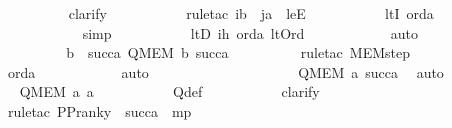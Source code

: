\begin{isabellebody}
\ \ \ \ \ \ \ \ \isamarkupfalse%
\ clarify\ \isanewline
\ \ \ \ \ \ \ \ \isamarkupfalse%
\ {\isacharparenleft}{\kern0pt}rule{\isacharunderscore}{\kern0pt}tac\ i{\isacharequal}{\kern0pt}b\ \ j{\isacharequal}{\kern0pt}a\ \ leE{\isacharparenright}{\kern0pt}\ \isanewline
\ \ \ \ \ \ \ \ \isamarkupfalse%
\ ltI\ orda\ \isanewline
\ \ \ \ \ \ \ \ \ \ \isamarkupfalse%
\ simp\ \isanewline
\ \ \ \ \ \ \ \ \isamarkupfalse%
\ ltD\ ih\ orda\ lt{\isacharunderscore}{\kern0pt}Ord\ \isanewline
\ \ \ \ \ \ \ \ \ \isamarkupfalse%
\ auto\ \isanewline
\ \ \ \ \ \ \ \ \isamarkupfalse%
\ \isanewline
\ \ \ \ \ \ \isamarkupfalse%
\ \isamarkupfalse%
\ {\isachardoublequoteopen}{\isasymforall}b\ {\isasymin}\ succ{\isacharparenleft}{\kern0pt}a{\isacharparenright}{\kern0pt}{\isachardot}{\kern0pt}\ Q{\isacharparenleft}{\kern0pt}MEM{\isacharcomma}{\kern0pt}\ b{\isacharcomma}{\kern0pt}\ succ{\isacharparenleft}{\kern0pt}a{\isacharparenright}{\kern0pt}{\isacharparenright}{\kern0pt}{\isachardoublequoteclose}\isanewline
\ \ \ \ \ \ \ \ \isamarkupfalse%
\ {\isacharparenleft}{\kern0pt}rule{\isacharunderscore}{\kern0pt}tac\ MEM{\isacharunderscore}{\kern0pt}step{\isacharparenright}{\kern0pt}\ \isanewline
\ \ \ \ \ \ \ \ \isamarkupfalse%
\ orda\ \isanewline
\ \ \ \ \ \ \ \ \ \isamarkupfalse%
\ auto\ \isanewline
\ \ \ \ \ \ \ \ \isamarkupfalse%
\ \isanewline
\ \ \ \ \ \ \isamarkupfalse%
\ \isamarkupfalse%
\ {\isachardoublequoteopen}Q{\isacharparenleft}{\kern0pt}MEM{\isacharcomma}{\kern0pt}\ a{\isacharcomma}{\kern0pt}\ succ{\isacharparenleft}{\kern0pt}a{\isacharparenright}{\kern0pt}{\isacharparenright}{\kern0pt}{\isachardoublequoteclose}\ \isamarkupfalse%
\ auto\ \isanewline
\ \ \ \ \ \ \isamarkupfalse%
\ \isamarkupfalse%
\ {\isachardoublequoteopen}Q{\isacharparenleft}{\kern0pt}MEM{\isacharcomma}{\kern0pt}\ a{\isacharcomma}{\kern0pt}\ a{\isacharparenright}{\kern0pt}{\isachardoublequoteclose}\ \isanewline
\ \ \ \ \ \ \ \ \isamarkupfalse%
\ Q{\isacharunderscore}{\kern0pt}def\ \isanewline
\ \ \ \ \ \ \ \ \isamarkupfalse%
\ clarify\ \isanewline
\ \ \ \ \ \ \ \ \isamarkupfalse%
\ {\isacharparenleft}{\kern0pt}rule{\isacharunderscore}{\kern0pt}tac\ P{\isacharequal}{\kern0pt}{\isachardoublequoteopen}P{\isacharunderscore}{\kern0pt}rank{\isacharparenleft}{\kern0pt}y{\isacharparenright}{\kern0pt}\ {\isasymle}\ succ{\isacharparenleft}{\kern0pt}a{\isacharparenright}{\kern0pt}{\isachardoublequoteclose}\ \ mp{\isacharparenright}{\kern0pt}\ \isanewline

\end{isabellebody}
